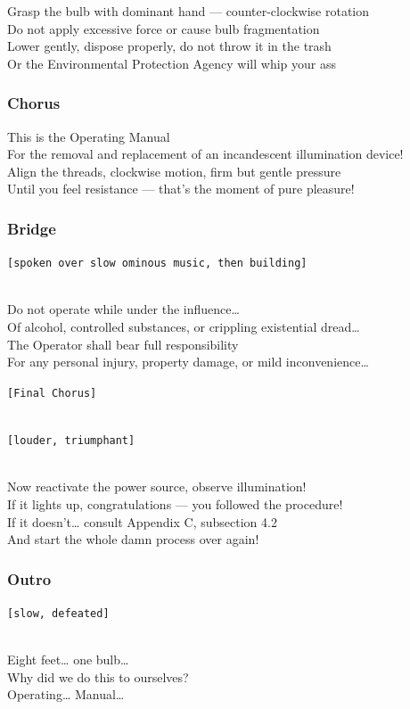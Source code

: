 Grasp the bulb with dominant hand --- counter-clockwise rotation\\
Do not apply excessive force or cause bulb fragmentation\\
Lower gently, dispose properly, do not throw it in the trash\\
Or the Environmental Protection Agency will whip your ass

\subsubsection{Chorus}\label{chorus-48}

This is the Operating Manual\\
For the removal and replacement of an incandescent illumination
device!\\
Align the threads, clockwise motion, firm but gentle pressure\\
Until you feel resistance --- that's the moment of pure pleasure!

\subsubsection{Bridge}\label{bridge-17}

\texttt{{[}spoken\ over\ slow\ ominous\ music,\ then\ building{]}}\strut \\
Do not operate while under the influence\ldots{}\\
Of alcohol, controlled substances, or crippling existential
dread\ldots{}\\
The Operator shall bear full responsibility\\
For any personal injury, property damage, or mild inconvenience\ldots{}

\texttt{{[}Final\ Chorus{]}}\strut \\
\texttt{{[}louder,\ triumphant{]}}\strut \\
Now reactivate the power source, observe illumination!\\
If it lights up, congratulations --- you followed the procedure!\\
If it doesn't\ldots{} consult Appendix C, subsection 4.2\\
And start the whole damn process over again!

\subsubsection{Outro}\label{outro-11}

\texttt{{[}slow,\ defeated{]}}\strut \\
Eight feet\ldots{} one bulb\ldots{}\\
Why did we do this to ourselves?\\
Operating\ldots{} Manual\ldots{}


